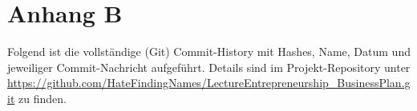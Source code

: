\chapter{Anhang B}

Folgend ist die vollständige (Git) Commit-History mit Hashes, Name, Datum und jeweiliger Commit-Nachricht aufgeführt.
Details sind im Projekt-Repository unter \url{https://github.com/HateFindingNames/LectureEntrepreneurship_BusinessPlan.git} zu finden.\par\medskip


